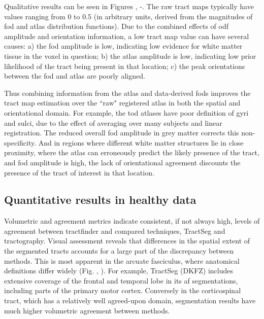 Qualitative results can be seen in Figures , -.
The raw tract maps typically have values ranging from 0 to 0.5 (in arbitrary units, derived from the magnitudes of \gls{fod} and atlas distribution functions).
Due to the combined effects of \gls{odf} amplitude and orientation information, a low tract map value can have several causes: a) the \gls{fod} amplitude is low, indicating low evidence for white matter tissue in the voxel in question; b) the atlas amplitude is low, indicating low prior likelihood of the tract being present in that location; c) the peak orientations between the \gls{fod} and atlas are poorly aligned.

Thus combining information from the atlas and data-derived \gls{fod}s improves the tract map estimation over the ``raw" registered atlas in both the spatial and orientational domain. For example, the \gls{tod} atlases have poor definition of gyri and sulci, due to the effect of averaging over many subjects and linear registration. The reduced overall \gls{fod} amplitude in grey matter corrects this non-specificity. And in regions where different white matter structures lie in close proximity, where the atlas can erroneously predict the likely presence of the tract, and \gls{fod} amplitude is high, the lack of orientational agreement discounts the presence of the tract of interest in that location.

\subsection{Quantitative results in healthy data}

Volumetric and agreement metrics indicate consistent, if not always high, levels of agreement between tractfinder and compared techniques, TractSeg and tractography.
Visual assessment reveals that differences in the spatial extent of the segmented tracts accounts for a large part of the discrepancy between methods.
This is most apparent in the arcuate fasciculus, where anatomical definitions differ widely (Fig. , ).
For example, TractSeg (DKFZ) includes extensive coverage of the frontal and temporal lobe in its \gls{af} segmentations, including parts of the primary motor cortex.
Conversely in the corticospinal tract, which has a relatively well agreed-upon domain, segmentation results have much higher volumetric agreement between methods.

